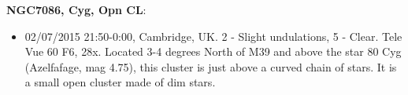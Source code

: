 {\bf NGC7086, Cyg, Opn CL}:
\begin{itemize}
\item 02/07/2015 21:50-0:00, Cambridge, UK. 2 - Slight undulations, 5 - Clear. Tele Vue 60 F6, 28x. Located 3-4 degrees North of M39 and above the star 80 Cyg (Azelfafage, mag 4.75), this cluster is just above a curved chain of stars. It is a small open cluster made of dim stars.
\end{itemize}
